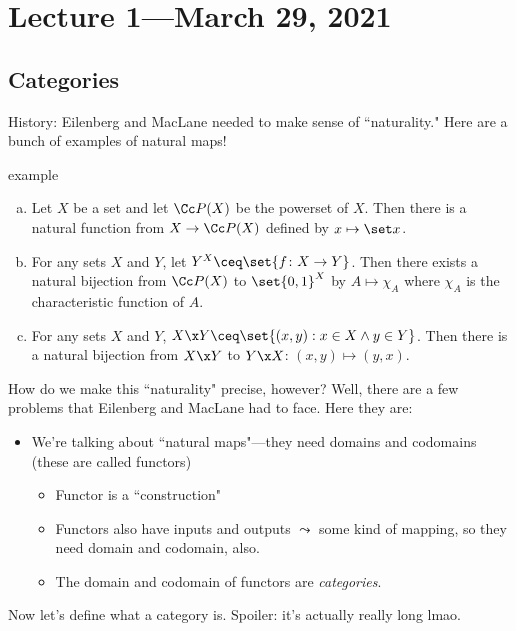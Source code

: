 \documentclass[class=article, crop=false]{standalone}
\begin{document}
\section{Lecture 1---March 29, 2021}

\subsection*{Categories}
History: Eilenberg and MacLane needed to make sense of ``naturality." Here are a bunch of examples of natural maps!

\begin{understandingcheck}{example}
  \begin{enumerate}[(a)]
    \item
      Let $X$ be a set and let $\Cc P(X)$ be the powerset of $X$. Then there is a natural function from $X \to \Cc P(X)$ defined by $x \mapsto \set x$.

    \item
      For any sets $X$ and $Y$, let $Y^X \ceq \set{f\colon X \to Y}$. Then there exists a natural bijection from $\Cc P(X)$ to $\set{0,1}^X$ by $A \mapsto \chi_A$ where $\chi_A$ is the characteristic function of $A$.

    \item
      For any sets $X$ and $Y$, $X \x Y \ceq \set{(x,y) : x \in X \land y \in Y}$. Then there is a natural bijection from $X \x Y$ to $Y \x X$: $(x,y) \mapsto (y,x)$.
  \end{enumerate}
\end{understandingcheck}

How do we make this ``naturality" precise, however? Well, there are a few problems that Eilenberg and MacLane had to face. Here they are:
  \begin{itemize}
    \item We're talking about ``natural maps"---they need domains and codomains (these are called functors)
      \begin{itemize}
        \item Functor is a ``construction"
        \item Functors also have inputs and outputs $\leadsto$ some kind of mapping, so they need domain and codomain, also.
        \item The domain and codomain of functors are \emph{categories}.
      \end{itemize}
  \end{itemize}

Now let's define what a category is. Spoiler: it's actually really long lmao.
\end{document}
